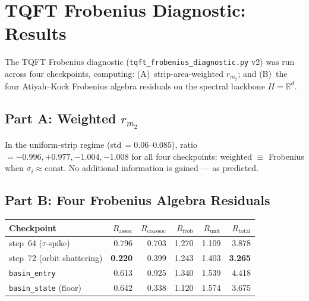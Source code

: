 \documentclass[11pt]{amsart}
\begin{document}
\section{TQFT Frobenius Diagnostic: Results}
\label{sec:tqft_results}

The TQFT Frobenius diagnostic (\texttt{tqft\_frobenius\_diagnostic.py} v2)
was run across four checkpoints, computing:
(A)~strip-area-weighted $r_{m_2}$; and
(B)~the four Atiyah--Kock Frobenius algebra residuals
on the spectral backbone $H = \mathbb{R}^d$.

\subsection{Part A: Weighted $r_{m_2}$}

In the uniform-strip regime (std\,$= 0.06$--$0.085$),
ratio $= -0.996, +0.977, -1.004, -1.008$ for all four checkpoints:
weighted $\equiv$ Frobenius when $\sigma_i \approx \mathrm{const}$.
No additional information is gained --- as predicted.

\subsection{Part B: Four Frobenius Algebra Residuals}

\begin{center}
\small
\begin{tabular}{@{}lrrrrr@{}}
\toprule
Checkpoint & $R_\mathrm{assoc}$ & $R_\mathrm{coassoc}$
           & $R_\mathrm{frob}$ & $R_\mathrm{unit}$ & $R_\mathrm{total}$ \\
\midrule
step~64 ($\tau$-spike)        & 0.796 & 0.703 & 1.270 & 1.109 & 3.878 \\
step~72 (orbit shattering)     & \textbf{0.220} & 0.399 & 1.243 & 1.403 & \textbf{3.265} \\
\texttt{basin\_entry}        & 0.613 & 0.925 & 1.340 & 1.539 & 4.418 \\
\texttt{basin\_state} (floor) & 0.642 & 0.338 & 1.120 & 1.574 & 3.675 \\
\bottomrule
\end{tabular}
\end{center}
\end{document}
